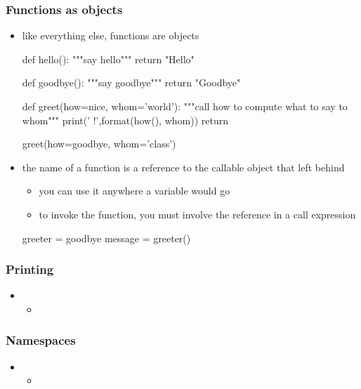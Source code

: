 \begin{frame}[fragile]
%
  \frametitle{Functions as objects}
%
  \begin{itemize}
%
  \item like everything else, functions are objects
    \begin{ipython}{}
      def hello():
          """say hello"""
          return "Hello"
      
      def goodbye():
          """say goodbye"""
          return "Goodbye"

      def greet(how=nice, whom='world'):
          """call {how} to compute what to say to {whom}"""
          print('{} {}!',format(how(), whom))
          return
          
      greet(how=goodbye, whom='class')
    \end{ipython}
%
  \item the name of a function is a reference to the callable object that  left
    behind
    \begin{itemize}
    \item you can use it anywhere a variable would go
    \item to invoke the function, you must involve the reference in a call expression
    \end{itemize}
    \begin{ipython}{}
      greeter = goodbye
      message = greeter()
    \end{ipython}
%
  \end{itemize}
%
\end{frame}

\begin{frame}[fragile]
%
  \frametitle{Printing}
%
  \begin{itemize}
%
  \item 
    \begin{itemize}
    \item
    \end{itemize}
%
  \end{itemize}
%
\end{frame}

\begin{frame}[fragile]
%
  \frametitle{Namespaces}
%
  \begin{itemize}
%
  \item 
    \begin{itemize}
    \item
    \end{itemize}
%
  \end{itemize}
%
\end{frame}

